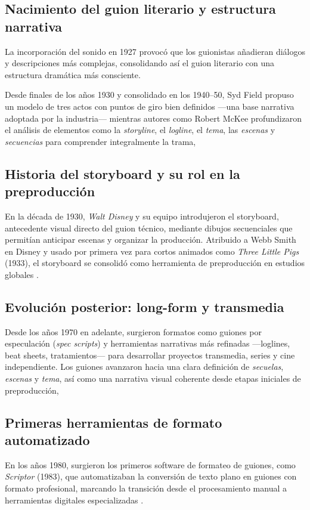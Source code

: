 \documentclass[12pt]{article}
\begin{document}
	\subsection{Nacimiento del guion literario y estructura narrativa}
	La incorporación del sonido en 1927 provocó que los guionistas añadieran diálogos y descripciones más complejas, consolidando así el guion literario con una estructura dramática más consciente.

	Desde finales de los años 1930 y consolidado en los 1940–50, Syd Field propuso un modelo de tres actos con puntos de giro bien definidos —una base narrativa adoptada por la industria— mientras autores como Robert McKee profundizaron el análisis de elementos como la \textit{storyline}, el \textit{logline}, el \textit{tema}, las \textit{escenas} y \textit{secuencias} para comprender integralmente la trama, \parencite{screenwriting_history_scriptor, thescriptlab_history}

	\subsection{Historia del storyboard y su rol en la preproducción}
	En la década de 1930, \textit{Walt Disney} y su equipo introdujeron el storyboard, antecedente visual directo del guion técnico, mediante dibujos secuenciales que permitían anticipar escenas y organizar la producción. Atribuido a Webb Smith en Disney y usado por primera vez para cortos animados como \textit{Three Little Pigs} (1933), el storyboard se consolidó como herramienta de preproducción en estudios globales \parencite{thescriptlab_history}.

	\subsection{Evolución posterior: long-form y transmedia}
	Desde los años 1970 en adelante, surgieron formatos como guiones por especulación (\textit{spec scripts}) y herramientas narrativas más refinadas —loglines, beat sheets, tratamientos— para desarrollar proyectos transmedia, series y cine independiente. Los guiones avanzaron hacia una clara definición de \textit{secuelas}, \textit{escenas} y \textit{tema}, así como una narrativa visual coherente desde etapas iniciales de preproducción, \parencite{thescriptlab_history}

	\subsection{Primeras herramientas de formato automatizado}
	En los años 1980, surgieron los primeros software de formateo de guiones, como \textit{Scriptor} (1983), que automatizaban la conversión de texto plano en guiones con formato profesional, marcando la transición desde el procesamiento manual a herramientas digitales especializadas \parencite{screenwriting_history_scriptor}.
\end{document}
